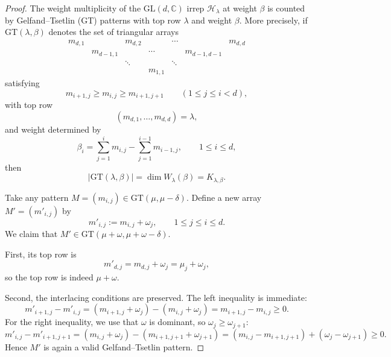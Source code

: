 \documentclass[a4paper,onecolumn,11pt]{quantumarticle}
\def\h{\mathcal{H}}
\begin{document}
\begin{proof}

The weight multiplicity of the $\mathrm{GL}(d,\mathbb C)$ irrep $\h_\lambda$ at weight $\beta$ is counted by Gelfand--Tsetlin (GT) patterns with top row $\lambda$ and weight $\beta$. More precisely, if $\mathrm{GT}(\lambda,\beta)$ denotes the set of triangular arrays
\begin{equation}
\begin{matrix}
m_{d,1} && m_{d,2} && \cdots && m_{d,d}\\
& m_{d-1,1} && \cdots && m_{d-1,d-1} & \\
&& \ddots && \ddots && \\
&&& m_{1,1} &&&
\end{matrix}
\end{equation}
satisfying
\begin{equation}
    m_{i+1,j}\ge m_{i,j}\ge m_{i+1,j+1}
    \qquad (1\le j\le i<d),
\end{equation}
with top row
\begin{equation}
    (m_{d,1},\dots,m_{d,d})=\lambda,
\end{equation}
and weight determined by
\begin{equation}
    \beta_i =
    \sum_{j=1}^i m_{i,j} -
    \sum_{j=1}^{i-1} m_{i-1,j},
    \qquad 1\le i\le d,
\end{equation}
then
\begin{equation}
    |\mathrm{GT}(\lambda,\beta)|=\dim W_\lambda(\beta)=K_{\lambda,\beta}.
\end{equation}

Take any pattern $M=(m_{i,j})\in \mathrm{GT}(\mu,\mu-\delta)$.
Define a new array $M'=(m'_{i,j})$ by
\begin{equation}
    m'_{i,j}:= m_{i,j}+\omega_j,
    \qquad 1\le j\le i\le d.
\end{equation}
We claim that $M'\in \mathrm{GT}(\mu+\omega,\mu+\omega-\delta)$.

First, its top row is
\begin{equation}
    m'_{d,j}=m_{d,j}+\omega_j=\mu_j+\omega_j,
\end{equation}
so the top row is indeed $\mu+\omega$.

Second, the interlacing conditions are preserved. The left inequality is immediate:
\begin{equation}
    m'_{i+1,j}-m'_{i,j}
    =
    (m_{i+1,j}+\omega_j)-(m_{i,j}+\omega_j)
    =
    m_{i+1,j}-m_{i,j}
    \ge 0.
\end{equation}
For the right inequality, we use that $\omega$ is dominant, so $\omega_j\ge \omega_{j+1}$:
\begin{equation}
    m'_{i,j}-m'_{i+1,j+1}
    =
    (m_{i,j}+\omega_j)-(m_{i+1,j+1}+\omega_{j+1})
    =
    (m_{i,j}-m_{i+1,j+1})+(\omega_j-\omega_{j+1})
    \ge 0.
\end{equation}
Hence $M'$ is again a valid Gelfand--Tsetlin pattern.


\end{proof}
\end{document}
